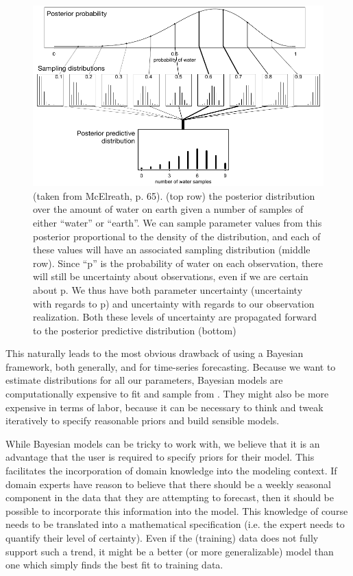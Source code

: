 \documentclass{article}
\begin{document}
\begin{figure}[H]
    \centerline{\includegraphics[scale = 0.5]{images/McElreath.png}}
    \caption{(taken from McElreath, p. 65). (top row) the posterior distribution over the amount of water on earth given a number of samples of either “water” or “earth”. We can sample parameter values from this posterior proportional to the density of the distribution, and each of these values will have an associated sampling distribution (middle row). Since “p” is the probability of water on each observation, there will still be uncertainty about observations, even if we are certain about p. We thus have both parameter uncertainty (uncertainty with regards to p) and uncertainty with regards to our observation realization. Both these levels of uncertainty are propagated forward to the posterior predictive distribution (bottom)}
\end{figure}

This naturally leads to the most obvious drawback of using a Bayesian framework, both generally, and for time-series forecasting. Because we want to estimate distributions for all our parameters, Bayesian models are computationally expensive to fit and sample from \cite[p.~13]{McElreath}. They might also be more expensive in terms of labor, because it can be necessary to think and tweak iteratively to specify reasonable priors and build sensible models.

While Bayesian models can be tricky to work with, we believe that it is an advantage that the user is required to specify priors for their model. This facilitates the incorporation of domain knowledge into the modeling context. If domain experts have reason to believe that there should be a weekly seasonal component in the data that they are attempting to forecast, then it should be possible to incorporate this information into the model. This knowledge of course needs to be translated into a mathematical specification (i.e. the expert needs to quantify their level of certainty). Even if the (training) data does not fully support such a trend, it might be a better (or more generalizable) model than one which simply finds the best fit to training data. 
\end{document}
